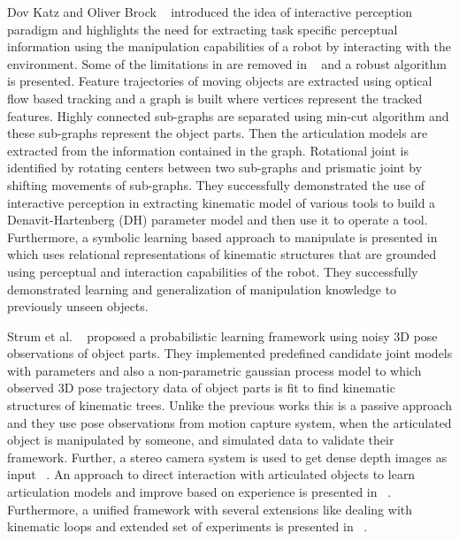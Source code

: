 \documentclass[12pt,a4paper]{report}
\begin{document}
Dov Katz and Oliver Brock ~\cite{katz2007interactive} introduced the idea of interactive perception paradigm and highlights the need for extracting task specific perceptual information using the manipulation capabilities of a robot by interacting with the environment. Some of the limitations in \cite{katz2007interactive} are removed in ~\cite{katz2008manipulating} and a robust algorithm is presented. Feature trajectories of moving objects are extracted using optical flow based tracking and a graph is built where vertices represent the tracked features. Highly connected sub-graphs are separated using min-cut algorithm and these sub-graphs represent the object parts. Then the articulation models are extracted from the information contained in the graph. Rotational joint is identified by rotating centers between two sub-graphs and prismatic joint by shifting movements of sub-graphs. They successfully demonstrated the use of interactive perception in extracting kinematic model of various tools to build a Denavit-Hartenberg (DH) parameter model and then use it to operate a tool. Furthermore, a symbolic learning based approach to manipulate is presented in ~\cite{brock2009learning} which uses relational representations of kinematic structures that are grounded using perceptual and interaction capabilities of the robot. They successfully demonstrated learning and generalization of manipulation knowledge to previously unseen objects. 

Strum et al. ~\cite{sturm2009learning} proposed a probabilistic learning framework using noisy 3D pose observations of object parts. They implemented predefined candidate joint models with parameters and also a non-parametric gaussian process model to which observed 3D pose trajectory data of object parts is fit to find kinematic structures of kinematic trees. Unlike the previous works this is a passive approach and they use pose observations from motion capture system, when the articulated object is manipulated by someone, and simulated data to validate their framework. Further, a stereo camera system is used to get dense depth images as input ~\cite{sturm20103d}. An approach to direct interaction with articulated objects to learn articulation models and improve based on experience is presented in ~\cite{sturm2010operating}. Furthermore, a unified framework with several extensions like dealing with kinematic loops and extended set of experiments is presented in ~\cite{sturm2011probabilistic}.
\end{document}
